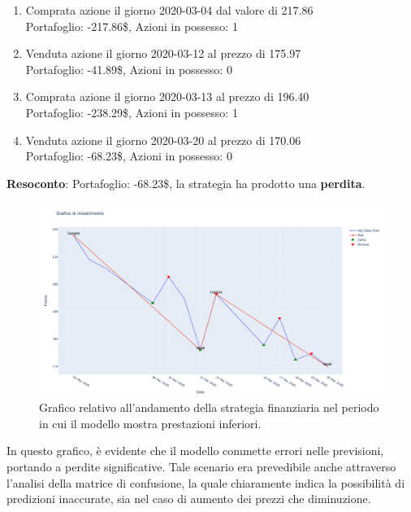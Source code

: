 \documentclass{article}
\begin{document}
\begin{enumerate}
\item Comprata azione il giorno 2020-03-04 dal valore di 217.86 \\
Portafoglio: -217.86\$, Azioni in possesso: 1

\item Venduta azione il giorno 2020-03-12 al prezzo di 175.97 \\
Portafoglio: -41.89\$, Azioni in possesso: 0

\item Comprata azione il giorno 2020-03-13 al prezzo di 196.40 \\
Portafoglio: -238.29\$, Azioni in possesso: 1

\item Venduta azione il giorno 2020-03-20 al prezzo di 170.06 \\
Portafoglio: -68.23\$, Azioni in possesso: 0
     
\end{enumerate}
\textbf{Resoconto}:
Portafoglio: -68.23\$, la strategia ha prodotto una \textbf{perdita}.
\begin{figure}[H]
    \centering
    \includegraphics[width=1\linewidth]{strategyPlotFAil.png}
    \caption{\label{fig:strategyPlotFail}Grafico relativo all'andamento della strategia finanziaria nel periodo in cui il modello mostra prestazioni inferiori.}
\end{figure}
In questo grafico, è evidente che il modello commette errori nelle previsioni, portando a perdite significative. Tale scenario era prevedibile anche attraverso l'analisi della matrice di confusione, la quale chiaramente indica la possibilità di predizioni inaccurate, sia nel caso di aumento dei prezzi che diminuzione.
\end{document}
